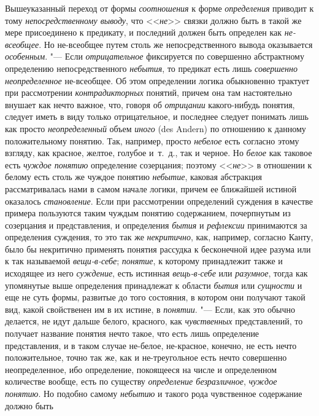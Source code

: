 Вышеуказанный переход от формы
{\em соотношения} к форме
{\em определения}
приводит к тому
{\em непосредственному выводу},
что <<{\em не}>>
связки должно быть в такой же мере присоединено к предикату,
и последний должен быть определен как
{\em не-всеобщее}. Но
не-всеобщее путем столь же непосредственного вывода оказывается
{\em особенным}. "--- Если
{\em отрицательное}
фиксируется по совершенно абстрактному определению
непосредственного {\em небытия},
то предикат есть лишь
{\em совершенно неопределенное}
не-всеобщее. Об этом определении логика обыкновенно трактует
при рассмотрении {\em контрадикторных}
понятий, причем она там настоятельно внушает как нечто
важное, что, говоря об {\em отрицании}
какого-нибудь понятия, следует иметь в виду только
отрицательное, и последнее следует понимать лишь как просто
{\em неопределенный}
объем {\em иного} (des
Andern) по отношению к данному положительному понятию. Так,
например, просто {\em небелое}
есть согласно этому взгляду, как красное, желтое, голубое
и~т.~д., так и черное. Но {\em белое}
как таковое есть
{\em чуждое понятию}
определение созерцания; поэтому
<<{\em не}>> в отношении к
белому есть столь же чуждое понятию
{\em небытие}, каковая
абстракция рассматривалась нами в самом начале логики, причем ее ближайшей
истиной оказалось {\em становление}.
Если при рассмотрении определений суждения в
качестве примера пользуются таким чуждым понятию
содержанием, почерпнутым из созерцания и представления, и определения
{\em бытия} и
{\em рефлексии}
принимаются за определения суждения, то это так же
{\em некритично}, как,
например, согласно Канту, было бы некритично применять понятия рассудка к
бесконечной идее разума или к так называемой
{\em вещи-в-себе};
{\em понятие}, к которому
принадлежит также и исходящее из него
{\em суждение}, есть
истинная {\em вещь-в-себе}
или {\em разумное},
тогда как упомянутые выше определения принадлежат к области
{\em бытия} или
{\em сущности} и еще не
суть формы, развитые до того состояния, в котором они получают такой вид,
какой свойственен им в их истине, в
{\em понятии}. "--- Если,
как это обычно делается, не идут дальше белого, красного, как
{\em чувственных}
представлений, то получает название понятия нечто такое, что
есть лишь определение представления, и в таком случае не-белое, не-красное,
конечно, не есть нечто положительное, точно так же, как и не-треугольное
есть нечто совершенно неопределенное, ибо определение, покоящееся на числе
и определенном количестве вообще, есть по существу
{\em определение безразличное},
{\em чуждое понятию}. Но
подобно самому {\em небытию}
и такого рода чувственное содержание должно быть
